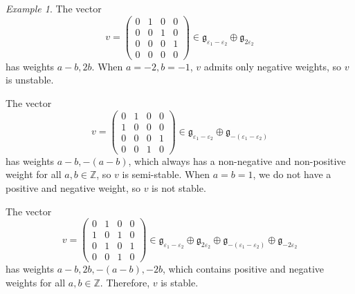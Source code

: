 \documentclass[12pt]{amsart}
\newcommand{\g}{\mathfrak{g}}
\theoremstyle{remark}
\theoremstyle{remark}
\newtheorem*{example}{Example}
\theoremstyle{remark}
\begin{document}
\begin{example}
The vector 
$$v = 
\begin{pmatrix}
	0 & 1 & 0 & 0 \\
	0 & 0 & 1 & 0 \\
	0 & 0 & 0 & 1 \\
	0 & 0 & 0 & 0 
\end{pmatrix} \in \g_{\varepsilon_1 - \varepsilon_2} \oplus \g_{2 \varepsilon_2}
$$
has weights $a-b, 2b$.
When $a = -2, b = -1$, $v$ admits only negative weights, so $v$ is unstable.

The vector 
$$v = 
\begin{pmatrix}
	0 & 1 & 0 & 0 \\
	1 & 0 & 0 & 0 \\
	0 & 0 & 0 & 1 \\
	0 & 0 & 1 & 0 
\end{pmatrix} \in \g_{\varepsilon_1 - \varepsilon_2} \oplus \g_{-(\varepsilon_1 -  \varepsilon_2)}
$$
has weights $a-b, -(a-b)$, which always has a non-negative and non-positive weight for all $a, b \in \mathbb{Z}$, so $v$ is semi-stable.
When $a=b=1$, we do not have a positive and negative weight, so $v$ is not stable.

The vector
$$v = 
\begin{pmatrix}
	0 & 1 & 0 & 0 \\
	1 & 0 & 1 & 0 \\
	0 & 1 & 0 & 1 \\
	0 & 0 & 1 & 0 
\end{pmatrix} \in \g_{\varepsilon_1 - \varepsilon_2} \oplus \g_{2 \varepsilon_2} \oplus \g_{-(\varepsilon_1 -  \varepsilon_2)} \oplus \g_{- 2\varepsilon_2} 
$$
has weights $a-b, 2b, -(a-b), -2b$, which contains positive and negative weights for all $a, b \in \mathbb{Z}$.
Therefore, $v$ is stable.
\end{example}
\end{document}
